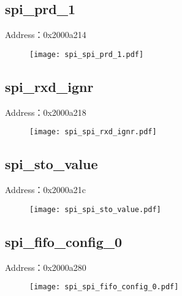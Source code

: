 \subsection{spi\_prd\_1}
\label{spi-spi-prd-1}
Address：0x2000a214
 \begin{figure}[H]
\texttt{[image: spi\_spi\_prd\_1.pdf]}
\end{figure}

\subsection{spi\_rxd\_ignr}
\label{spi-spi-rxd-ignr}
Address：0x2000a218
 \begin{figure}[H]
\texttt{[image: spi\_spi\_rxd\_ignr.pdf]}
\end{figure}

\subsection{spi\_sto\_value}
\label{spi-spi-sto-value}
Address：0x2000a21c
 \begin{figure}[H]
\texttt{[image: spi\_spi\_sto\_value.pdf]}
\end{figure}

\subsection{spi\_fifo\_config\_0}
\label{spi-spi-fifo-config-0}
Address：0x2000a280
 \begin{figure}[H]
\texttt{[image: spi\_spi\_fifo\_config\_0.pdf]}
\end{figure}

